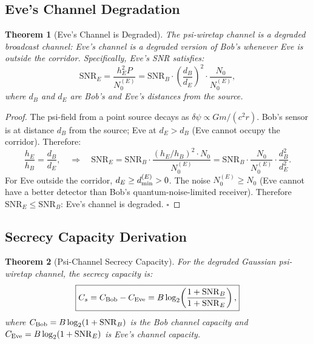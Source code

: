 \documentclass[aps,prd,twocolumn,superscriptaddress,nofootinbib]{revtex4-2}
\newcommand{\SNR}{\mathrm{SNR}}
\newtheorem{theorem}{Theorem}
\begin{document}
\subsection{Eve's Channel Degradation}

\begin{theorem}[Eve's Channel is Degraded]
\label{thm:degraded}
The psi-wiretap channel is a \emph{degraded broadcast channel}: Eve's channel
is a degraded version of Bob's whenever Eve is outside the corridor.
Specifically, Eve's SNR satisfies:
\begin{equation}
\SNR_E = \frac{h_E^2 P}{N_0^{(E)}}
= \SNR_B \cdot \left(\frac{d_B}{d_E}\right)^2 \cdot \frac{N_0}{N_0^{(E)}},
\label{eq:SNR-Eve}
\end{equation}
where $d_B$ and $d_E$ are Bob's and Eve's distances from the source.
\end{theorem}

\begin{proof}
The psi-field from a point source decays as $\delta\psi \propto G m / (c^2 r)$.
Bob's sensor is at distance $d_B$ from the source; Eve at $d_E > d_B$
(Eve cannot occupy the corridor). Therefore:
\begin{equation}
\frac{h_E}{h_B} = \frac{d_B}{d_E}, \quad \Rightarrow \quad
\SNR_E = \SNR_B \cdot \frac{(h_E/h_B)^2 \cdot N_0}{N_0^{(E)}}
= \SNR_B \cdot \frac{N_0}{N_0^{(E)}} \cdot \frac{d_B^2}{d_E^2}.
\end{equation}
For Eve outside the corridor, $d_E \geq d_{\rm min}^{(E)} > 0$.
The noise $N_0^{(E)} \geq N_0$ (Eve cannot have a better detector than Bob's
quantum-noise-limited receiver). Therefore $\SNR_E \leq \SNR_B$: Eve's channel
is degraded. $\square$
\end{proof}

\subsection{Secrecy Capacity Derivation}

\begin{theorem}[Psi-Channel Secrecy Capacity]
\label{thm:secrecy-cap}
For the degraded Gaussian psi-wiretap channel, the secrecy capacity is:
\begin{equation}
\boxed{
C_s = C_{\rm Bob} - C_{\rm Eve}
= B\log_2\!\left(\frac{1 + \SNR_B}{1 + \SNR_E}\right),
}
\label{eq:Cs-scalar}
\end{equation}
where $C_{\rm Bob} = B\log_2(1+\SNR_B)$ is the Bob channel capacity and
$C_{\rm Eve} = B\log_2(1+\SNR_E)$ is Eve's channel capacity.
\end{theorem}
\end{document}
